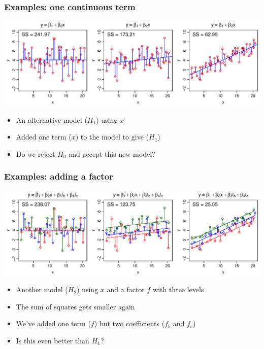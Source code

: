 \documentclass[aspectratio=43]{beamer}
\begin{document}
\begin{frame}[T]
\frametitle{Examples: one continuous term}

\includegraphics[width=\textwidth]{ANOVA_mod.pdf}

\begin{itemize}
\item An alternative model ($H_1$) using $x$
\item Added one term ($x$) to the model to give ($H_1$)
\item Do we reject $H_0$ and accept this new model?
\end{itemize}

\end{frame}


\begin{frame}[T]
\frametitle{Examples: adding a factor}

\includegraphics[width=\textwidth]{ANOVA_mod2.pdf}

\begin{itemize}
\item Another model ($H_2$) using $x$ and a factor $f$ with three levels
\item The sum of squares gets smaller again 
\item We've added one term ($f$) but two coefficients ($f_b$ and $f_c$)
\item Is this even better than $H_1$?
\end{itemize}

\end{frame}
\end{document}
